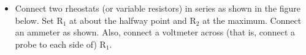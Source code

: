 \begin{itemize}
\item Connect two rheostats (or variable resistors) in series as shown in
the figure below. Set R\( _{1} \) at about the halfway point and
R\( _{2} \) at the maximum. Connect an ammeter as shown. Also, connect
a voltmeter across (that is, connect a probe to each side of) R\( _{1} \).
\end{itemize}
\vspace{0.3cm}
{\centering {} \par}
\vspace{0.3cm}

